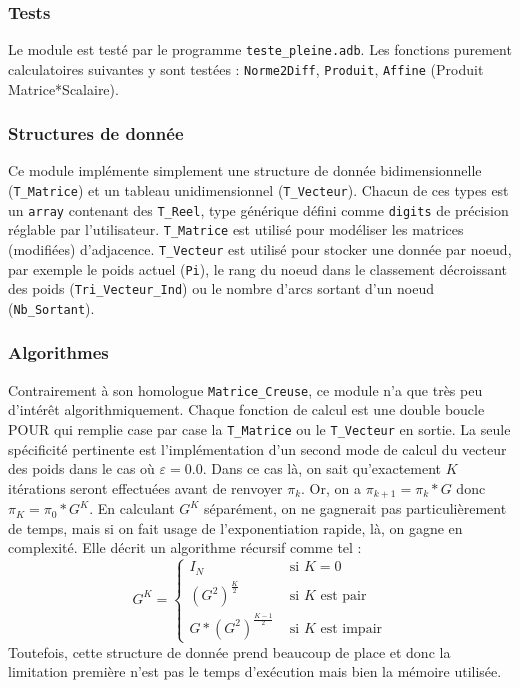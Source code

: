\documentclass{article}
\begin{document}
\subsubsection{Tests}

Le module est testé par le programme \texttt{teste\_pleine.adb}. Les fonctions purement calculatoires suivantes y sont testées : \texttt{Norme2Diff}, \texttt{Produit}, \texttt{Affine} (Produit Matrice*Scalaire).

\subsubsection{Structures de donnée}

Ce module implémente simplement une structure de donnée bidimensionnelle (\texttt{T\_Matrice}) et un tableau unidimensionnel (\texttt{T\_Vecteur}). Chacun de ces types est un \texttt{array} contenant des \texttt{T\_Reel}, type générique défini comme \texttt{digits} de précision réglable par l'utilisateur. \texttt{T\_Matrice} est utilisé pour modéliser les matrices (modifiées) d'adjacence. \texttt{T\_Vecteur} est utilisé pour stocker une donnée par noeud, par exemple le poids actuel (\texttt{Pi}), le rang du noeud dans le classement décroissant des poids (\texttt{Tri\_Vecteur\_Ind}) ou le nombre d'arcs sortant d'un noeud (\texttt{Nb\_Sortant}).

\subsubsection{Algorithmes}

Contrairement à son homologue \texttt{Matrice\_Creuse}, ce module n'a que très peu d'intérêt algorithmiquement. Chaque fonction de calcul est une double boucle POUR qui remplie case par case la \texttt{T\_Matrice} ou le \texttt{T\_Vecteur} en sortie. La seule spécificité pertinente est l'implémentation d'un second mode de calcul du vecteur des poids dans le cas où $\varepsilon = 0.0$. Dans ce cas là, on sait qu'exactement $K$ itérations seront effectuées avant de renvoyer $\pi_k$. Or, on a $\pi_{k+1} = \pi_k * G$ donc $\pi_K = \pi_0 * G^K$. En calculant $G^K$ séparément, on ne gagnerait pas particulièrement de temps, mais si on fait usage de l'exponentiation rapide, là, on gagne en complexité. Elle décrit un algorithme récursif comme tel :
$$G^K =
    \left\{\begin{array}{cl}
        I_N                   & \text{ si } K = 0                \\
        (G^2)^\frac{K}{2}     & \text{ si } K \text{ est pair}   \\
        G*(G^2)^\frac{K-1}{2} & \text{ si } K \text{ est impair}
    \end{array}\right.$$
Toutefois, cette structure de donnée prend beaucoup de place et donc la limitation première n'est pas le temps d'exécution mais bien la mémoire utilisée.
\end{document}
